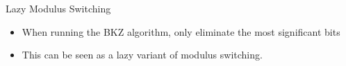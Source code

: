 \documentclass[10pt,compress]{beamer}
\renewcommand{\vec}[1]{\mathbf{#1}\xspace}
\renewcommand{\vec}[1]{\mathbf{#1}\xspace}
\begin{document}
\begin{frame}[fragile]{Lazy Modulus Switching}






  \begin{itemize}
  \item When running the BKZ algorithm, only eliminate the most significant bits
  \item This can be seen as a lazy variant of modulus switching.
  \end{itemize}


\end{frame}
\end{document}
